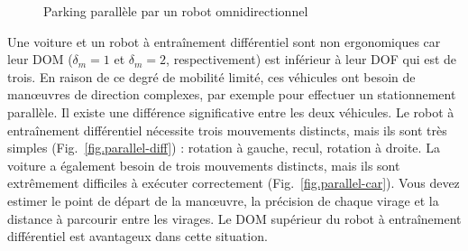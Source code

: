 {\begin{figure}
\begin{center}
\end{center}
\caption{Parking parallèle par un robot omnidirectionnel}\label{fig.parallel-omni}
\end{figure}

Une voiture et un robot à entraînement différentiel sont non ergonomiques car leur DOM ($\delta_m=1$ et $\delta_m=2$, respectivement) est inférieur à leur DOF qui est de trois. En raison de ce degré de mobilité limité, ces véhicules ont besoin de manœuvres de direction complexes, par exemple pour effectuer un stationnement parallèle. Il existe une différence significative entre les deux véhicules. Le robot à entraînement différentiel nécessite trois mouvements distincts, mais ils sont très simples (Fig.~\ref{fig.parallel-diff}) : rotation à gauche, recul, rotation à droite. La voiture a également besoin de trois mouvements distincts, mais ils sont extrêmement difficiles à exécuter correctement (Fig.~\ref{fig.parallel-car}). Vous devez estimer le point de départ de la manœuvre, la précision de chaque virage et la distance à parcourir entre les virages. Le DOM supérieur du robot à entraînement différentiel est avantageux dans cette situation.

}
